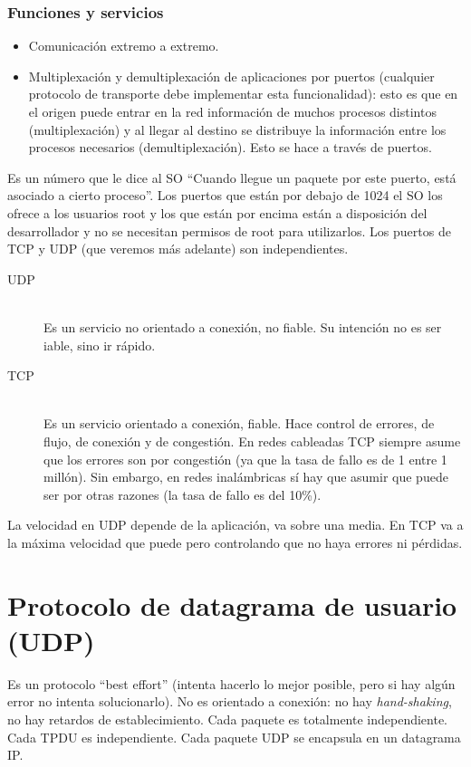 \subsubsection{Funciones y servicios}
\begin{itemize}
    \item Comunicación extremo a extremo.
    \item Multiplexación y demultiplexación de aplicaciones por puertos (cualquier protocolo de transporte debe implementar esta funcionalidad): esto es que en el origen puede entrar en la red información de muchos procesos distintos (multiplexación) y al llegar al destino se distribuye la información entre los procesos necesarios (demultiplexación). Esto se hace a través de puertos. 
\end{itemize}

\begin{definicion}[Puertos]
    Es un número que le dice al SO ``Cuando llegue un paquete por este puerto, está asociado a cierto proceso''. Los puertos que están por debajo de 1024 el SO los ofrece a los usuarios root y los que están por encima están a disposición del desarrollador y no se necesitan permisos de root para utilizarlos. Los puertos de TCP y UDP (que veremos más adelante) son independientes.
\end{definicion}

\begin{description}
    \item [UDP]~\\
        Es un servicio no orientado a conexión, no fiable. Su intención no es ser iable, sino ir rápido.
    \item [TCP]~\\ 
        Es un servicio orientado a conexión, fiable. Hace control de errores, de flujo, de conexión y de congestión. En redes cableadas TCP siempre asume que los errores son por congestión (ya que la tasa de fallo es de 1 entre 1 millón). Sin embargo, en redes inalámbricas sí hay que asumir que puede ser por otras razones (la tasa de fallo es del 10\%).
\end{description}

La velocidad en UDP depende de la aplicación, va sobre una media. En TCP va a la máxima velocidad que puede pero controlando que no haya errores ni pérdidas. 

\section{Protocolo de datagrama de usuario (UDP)}
Es un protocolo ``best effort'' (intenta hacerlo lo mejor posible, pero si hay algún error no intenta solucionarlo). No es orientado a conexión: no hay \textit{hand-shaking}, no hay retardos de establecimiento. Cada paquete es totalmente independiente. Cada \acrlong{TPDU} es independiente. Cada paquete UDP se encapsula en un datagrama IP. \\

